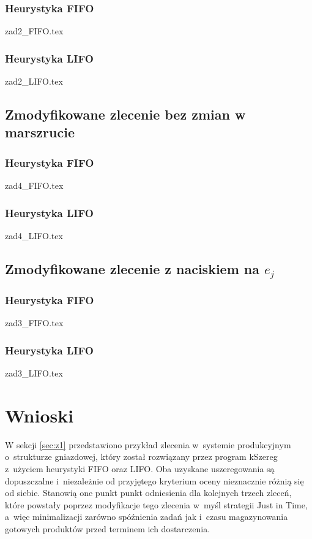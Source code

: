 \documentclass[twoside]{kInzynierka}
\begin{document}
\subsubsection  {Heurystyka FIFO}
\label{sec:z2f}
 {zad2_FIFO.tex}
\subsubsection  {Heurystyka LIFO}
\label{sec:z2l}
 {zad2_LIFO.tex}

\newpage
\subsection     {Zmodyfikowane zlecenie bez zmian w marszrucie}
\label{sec:z3}
\subsubsection  {Heurystyka FIFO}
\label{sec:z3f}
 {zad4_FIFO.tex}
\subsubsection  {Heurystyka LIFO}
\label{sec:z3l}
 {zad4_LIFO.tex}

\newpage
\subsection     {Zmodyfikowane zlecenie z naciskiem na $e_j$ }
\label{sec:z4}
\subsubsection  {Heurystyka FIFO}
\label{sec:z4f}
 {zad3_FIFO.tex}
\subsubsection  {Heurystyka LIFO}
\label{sec:z4l}
 {zad3_LIFO.tex}

\section        {Wnioski}
W sekcji \ref{sec:z1} przedstawiono przykład zlecenia w~systemie produkcyjnym o~strukturze gniazdowej, który został rozwiązany przez program kSzereg z~użyciem heurystyki FIFO oraz LIFO. Oba uzyskane uszeregowania są dopuszczalne i~niezależnie od przyjętego kryterium oceny nieznacznie różnią się od siebie. Stanowią one punkt punkt odniesienia dla kolejnych trzech zleceń, które powstały poprzez modyfikacje tego zlecenia w~myśl strategii Just in Time, a~więc minimalizacji zarówno spóźnienia zadań jak i~czasu magazynowania gotowych produktów przed terminem ich dostarczenia. 
\end{document}
